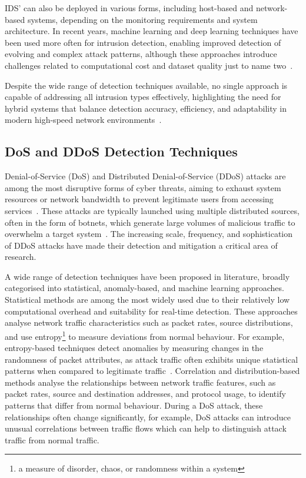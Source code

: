 IDS' can also be deployed in various forms, including host-based and network-based systems, depending on the monitoring requirements and system architecture. In recent years, machine learning and deep learning techniques have been used more often for intrusion detection, enabling improved detection of evolving and complex attack patterns, although these approaches introduce challenges related to computational cost and dataset quality just to name two~\cite{gupta_systematic_2022}.

Despite the wide range of detection techniques available, no single approach is capable of addressing all intrusion types effectively, highlighting the need for hybrid systems that balance detection accuracy, efficiency, and adaptability in modern high-speed network environments~\cite{biermann_comparison_2001, khraisat_survey_2019}.



\subsection{DoS and DDoS Detection Techniques}
Denial-of-Service (DoS) and Distributed Denial-of-Service (DDoS) attacks are among the most disruptive forms of cyber threats, aiming to exhaust system resources or network bandwidth to prevent legitimate users from accessing services~\cite{su_comprehensive_2024}. These attacks are typically launched using multiple distributed sources, often in the form of botnets, which generate large volumes of malicious traffic to overwhelm a target system~\cite{bawany_ddos_2017}. The increasing scale, frequency, and sophistication of DDoS attacks have made their detection and mitigation a critical area of research.

A wide range of detection techniques have been proposed in literature, broadly categorised into statistical, anomaly-based, and machine learning approaches. Statistical methods are among the most widely used due to their relatively low computational overhead and suitability for real-time detection. These approaches analyse network traffic characteristics such as packet rates, source distributions, and use entropy\footnote{a measure of disorder, chaos, or randomness within a system} to measure deviations from normal behaviour. For example, entropy-based techniques detect anomalies by measuring changes in the randomness of packet attributes, as attack traffic often exhibits unique statistical patterns when compared to legitimate traffic~\cite{feinstein_statistical_2003}. Correlation and distribution-based methods analyse the relationships between network traffic features, such as packet rates, source and destination addresses, and protocol usage, to identify patterns that differ from normal behaviour. During a DoS attack, these relationships often change significantly, for example, DoS attacks can introduce unusual correlations between traffic flows which can help to distinguish attack traffic from normal traffic.

